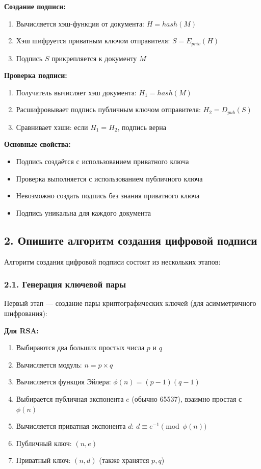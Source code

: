 \textbf{Создание подписи:}
\begin{enumerate}
    \item Вычисляется хэш-функция от документа: $H = hash(M)$
    \item Хэш шифруется приватным ключом отправителя: $S = E_{priv}(H)$
    \item Подпись $S$ прикрепляется к документу $M$
\end{enumerate}

\textbf{Проверка подписи:}
\begin{enumerate}
    \item Получатель вычисляет хэш документа: $H_1 = hash(M)$
    \item Расшифровывает подпись публичным ключом отправителя: $H_2 = D_{pub}(S)$
    \item Сравнивает хэши: если $H_1 = H_2$, подпись верна
\end{enumerate}

\textbf{Основные свойства:}
\begin{itemize}
    \item Подпись создаётся с использованием приватного ключа
    \item Проверка выполняется с использованием публичного ключа
    \item Невозможно создать подпись без знания приватного ключа
    \item Подпись уникальна для каждого документа
\end{itemize}

\subsection*{2. Опишите алгоритм создания цифровой подписи}

Алгоритм создания цифровой подписи состоит из нескольких этапов:

\subsubsection*{2.1. Генерация ключевой пары}

Первый этап — создание пары криптографических ключей (для асимметричного шифрования):

\textbf{Для RSA:}
\begin{enumerate}
    \item Выбираются два больших простых числа $p$ и $q$
    \item Вычисляется модуль: $n = p \times q$
    \item Вычисляется функция Эйлера: $\phi(n) = (p-1)(q-1)$
    \item Выбирается публичная экспонента $e$ (обычно 65537), взаимно простая с $\phi(n)$
    \item Вычисляется приватная экспонента $d$: $d \equiv e^{-1} \pmod{\phi(n)}$
    \item Публичный ключ: $(n, e)$
    \item Приватный ключ: $(n, d)$ (также хранятся $p, q$)
\end{enumerate}

